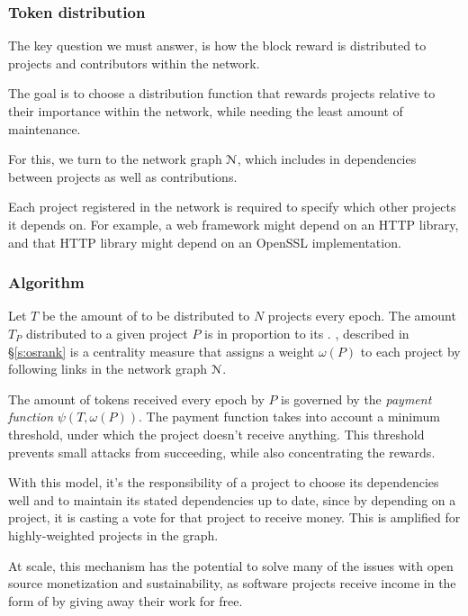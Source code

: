 \subsubsection{Token distribution}

The key question we must answer, is how the block reward is distributed to
projects and contributors within the network.

The goal is to choose a distribution function that rewards projects relative to
their importance within the network, while needing the least amount of
maintenance.


For this, we turn to the network graph $\mathcal{N}$, which includes in
dependencies between projects as well as contributions.

Each project registered in the network is required to specify which other
projects it depends on. For example, a web framework might depend on an HTTP
library, and that HTTP library might depend on an OpenSSL implementation.

\subsubsection{Algorithm} Let $T$ be the amount of \oscoin{} to be distributed
to $N$ projects every epoch. The amount $T_P$ distributed to a given project $P$
is in proportion to its \osrank{}. \osrank{}, described in \S \ref{s:osrank} is
a centrality measure that assigns a weight $\omega(P)$ to each project by
following links in the network graph $\mathcal{N}$.

The amount of tokens received every epoch by $P$ is governed by the
\emph{payment function} $\psi(T, \omega(P))$. The payment
function takes into account a minimum threshold, under which the project
doesn't receive anything. This threshold prevents small attacks from
succeeding, while also concentrating the rewards.

With this model, it’s the responsibility of a project to choose its
dependencies well and to maintain its stated dependencies up to date, since by
depending on a project, it is casting a vote for that project to receive money.
This is amplified for highly-weighted projects in the graph.

At scale, this mechanism has the potential to solve many of the issues with
open source monetization and sustainability, as software projects receive
income in the form of \oscoin{} by giving away their work for free.

